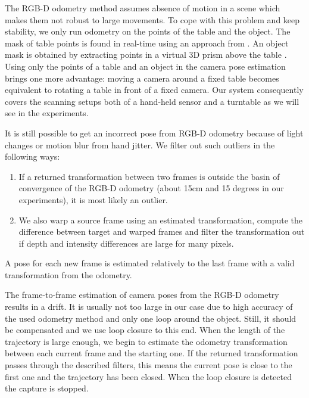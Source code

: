 \documentclass[letterpaper, 10 pt, conference]{ieeeconf}  %
\begin{document}
The RGB-D odometry method assumes absence of motion in a scene which makes them not
robust to large movements. To cope with this problem and keep stability, we only run odometry
on the points of the table and the object. The mask of table points
is found in real-time using an approach from \cite{poppinga2008fast}. An object mask is
obtained by extracting points in a virtual 3D prism above the table \cite{rusu2009detecting}.
Using only the points
of a table and an object in the camera pose estimation brings one more advantage:
moving a camera around a fixed table becomes equivalent to rotating
a table in front of a fixed camera. Our system consequently covers the scanning setups both of a hand-held sensor 
and a turntable as we will see in the experiments.

It is still possible to get an incorrect pose from RGB-D odometry
because of light changes or motion blur from hand jitter. We filter out such outliers in the following ways:

\begin{enumerate}
 \item If a returned transformation between two frames is outside the basin of convergence
 of the RGB-D odometry (about 15cm and 15 degrees in our experiments), it is most likely an outlier.
 \item We also warp a source frame using an estimated transformation,
 compute the difference between target and warped frames 
 and filter the transformation out if
 depth and intensity differences are large for many pixels.
\end{enumerate}

A pose for each new frame is estimated relatively to the last frame
with a valid transformation from the odometry.

The frame-to-frame estimation of camera poses from the RGB-D 
odometry results in a drift. It is usually not too large in our case
due to high accuracy of the used odometry method \cite{steinbrucker2011real}
and only one loop around the object.
Still, it should be compensated and we use loop closure to this end.
When the length of the trajectory is large enough, we begin to estimate the
odometry transformation between each current frame and the starting one. 
If the returned transformation passes through the described filters, 
this means the current pose is close to the first one and 
the trajectory has been closed. When the loop closure is detected 
the capture is stopped.
\end{document}
